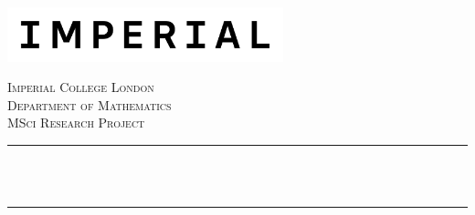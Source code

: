 \begin{titlepage}

\newcommand{\HRule}{\rule{\linewidth}{0.5mm}} %


\includegraphics[width=8cm]{Title/logo.png}\\[1cm] %
 

\center %


\textsc{\LARGE Imperial College London}\\[0.5cm] %
\textsc{\Large Department of Mathematics}\\[1.5cm] %
\textsc{\Large MSci Research Project}\\[0.5cm] %

\makeatletter
\HRule \\[0.6cm]
{ \huge \bfseries \reporttitle}\\[0.6cm] %
\HRule \\[1.5cm]
 


\end{titlepage}
